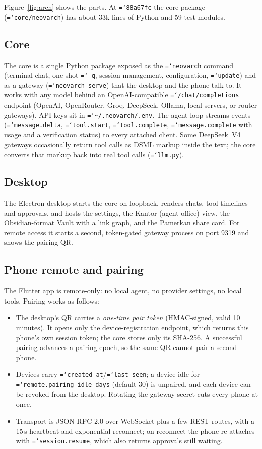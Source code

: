 \documentclass[11pt]{article}
\newcommand{\code}[1]{\texttt{\hyphenchar\font=`\-\relax #1}}
\begin{document}
Figure~\ref{fig:arch} shows the parts. At \code{88a67fc} the core package (\code{core/neovarch}) has about 33k lines of Python and 59 test modules.

\subsection{Core}
The core is a single Python package exposed as the \code{neovarch} command (terminal chat, one-shot \code{-q}, session
management, configuration, \code{update}) and as a gateway (\code{neovarch serve}) that the desktop and the phone talk to.
It works with any model behind an OpenAI-compatible \code{/chat/completions} endpoint (OpenAI, OpenRouter, Groq, DeepSeek, Ollama, local servers, or
router gateways). API keys sit in \code{\textasciitilde/.neovarch/.env}. The agent loop streams events (\code{message.delta}, \code{tool.start},
\code{tool.complete}, \code{message.complete} with usage and a verification status) to every attached client.
Some DeepSeek~V4 gateways occasionally return tool calls as DSML markup inside the text; the core converts that markup back into real tool calls (\code{llm.py}).

\subsection{Desktop}
The Electron desktop starts the core on loopback, renders chats, tool timelines and approvals, and hosts the settings, the Kantor
(agent office) view, the Obsidian-format Vault with a link graph, and the Pamerkan share card. For remote access it starts a second,
token-gated gateway process on port 9319 and shows the pairing QR.

\subsection{Phone remote and pairing}
The Flutter app is remote-only: no local agent, no provider settings, no local tools. Pairing works as follows:
\begin{itemize}
\item The desktop's QR carries a \emph{one-time pair token} (HMAC-signed, valid 10 minutes). It opens only the device-registration
  endpoint, which returns this phone's own session token; the core stores only its SHA-256. A successful pairing advances a pairing epoch,
  so the same QR cannot pair a second phone.
\item Devices carry \code{created\_at}/\code{last\_seen}; a device idle for \code{remote.pairing\_idle\_days} (default 30) is unpaired, and each
  device can be revoked from the desktop. Rotating the gateway secret cuts every phone at once.
\item Transport is JSON-RPC 2.0 over WebSocket plus a few REST routes, with a 15\,s heartbeat and exponential reconnect; on reconnect the
  phone re-attaches with \code{session.resume}, which also returns approvals still waiting.
\end{itemize}
\end{document}
